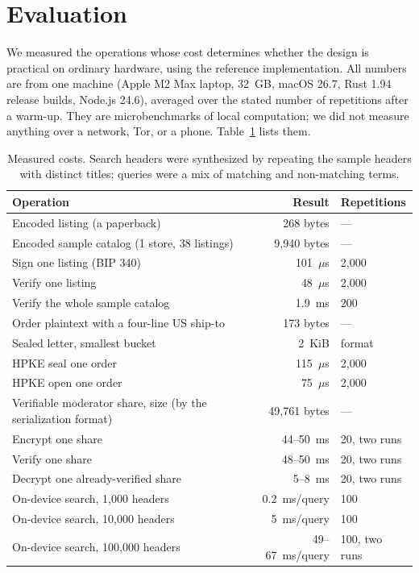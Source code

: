 \section{Evaluation}
\label{sec:evaluation}

We measured the operations whose cost determines whether the design is practical on ordinary hardware, using the reference implementation. All numbers are from one machine (Apple M2 Max laptop, 32~GB, macOS 26.7, Rust 1.94 release builds, Node.js 24.6), averaged over the stated number of repetitions after a warm-up. They are microbenchmarks of local computation; we did not measure anything over a network, Tor, or a phone. Table~\ref{tab:measure} lists them.

\begin{table}[ht]
\centering\small
\begin{tabularx}{\textwidth}{@{}Xrl@{}}
\toprule
\textbf{Operation} & \textbf{Result} & \textbf{Repetitions} \\
\midrule
Encoded listing (a paperback) & 268 bytes & --- \\
Encoded sample catalog (1 store, 38 listings) & 9{,}940 bytes & --- \\
Sign one listing (BIP 340) & 101~$\mu$s & 2{,}000 \\
Verify one listing & 48~$\mu$s & 2{,}000 \\
Verify the whole sample catalog & 1.9~ms & 200 \\
Order plaintext with a four-line US ship-to & 173 bytes & --- \\
Sealed letter, smallest bucket & 2~KiB & format \\
HPKE seal one order & 115~$\mu$s & 2{,}000 \\
HPKE open one order & 75~$\mu$s & 2{,}000 \\
Verifiable moderator share, size (by the serialization format) & 49{,}761 bytes & --- \\
Encrypt one share & 44--50~ms & 20, two runs \\
Verify one share & 48--50~ms & 20, two runs \\
Decrypt one already-verified share & 5--8~ms & 20, two runs \\
On-device search, 1{,}000 headers & 0.2~ms/query & 100 \\
On-device search, 10{,}000 headers & 5~ms/query & 100 \\
On-device search, 100{,}000 headers & 49--67~ms/query & 100, two runs \\
\bottomrule
\end{tabularx}
\caption{Measured costs. Search headers were synthesized by repeating the sample headers with distinct titles; queries were a mix of matching and non-matching terms.}
\label{tab:measure}
\end{table}

